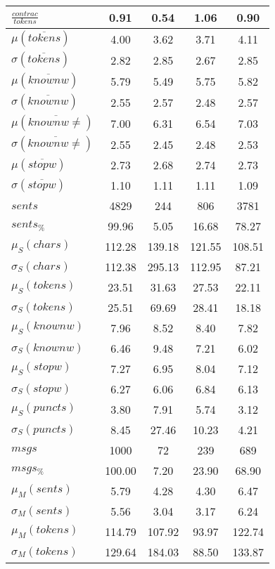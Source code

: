 \begin{table}[h!]
\begin{center}
\begin{tabular}{| l || c | c | c | c |}
$\frac{contrac}{tokens}$ & 0.91  & 0.54  & 1.06  & 0.90 \\\hline\hline
$\mu(\overline{tokens})$ & 4.00  & 3.62  & 3.71  & 4.11 \\
$\sigma(\overline{tokens})$ & 2.82  & 2.85  & 2.67  & 2.85 \\\hline
$\mu(\overline{knownw})$ & 5.79  & 5.49  & 5.75  & 5.82 \\
$\sigma(\overline{knownw})$ & 2.55  & 2.57  & 2.48  & 2.57 \\\hline
$\mu(\overline{knownw \neq})$ & 7.00  & 6.31  & 6.54  & 7.03 \\
$\sigma(\overline{knownw \neq})$ & 2.55  & 2.45  & 2.48  & 2.53 \\\hline
$\mu(\overline{stopw})$ & 2.73  & 2.68  & 2.74  & 2.73 \\
$\sigma(\overline{stopw})$ & 1.10  & 1.11  & 1.11  & 1.09 \\\hline\hline
$sents$ & 4829  & 244  & 806  & 3781 \\
$sents_{\%}$ & 99.96  & 5.05  & 16.68  & 78.27 \\\hline
$\mu_S(chars)$ & 112.28  & 139.18  & 121.55  & 108.51 \\
$\sigma_S(chars)$ & 112.38  & 295.13  & 112.95  & 87.21 \\\hline
$\mu_S(tokens)$ & 23.51  & 31.63  & 27.53  & 22.11 \\
$\sigma_S(tokens)$ & 25.51  & 69.69  & 28.41  & 18.18 \\\hline
$\mu_S(knownw)$ & 7.96  & 8.52  & 8.40  & 7.82 \\
$\sigma_S(knownw)$ & 6.46  & 9.48  & 7.21  & 6.02 \\\hline
$\mu_S(stopw)$ & 7.27  & 6.95  & 8.04  & 7.12 \\
$\sigma_S(stopw)$ & 6.27  & 6.06  & 6.84  & 6.13 \\\hline
$\mu_S(puncts)$ & 3.80  & 7.91  & 5.74  & 3.12 \\
$\sigma_S(puncts)$ & 8.45  & 27.46  & 10.23  & 4.21 \\\hline\hline
$msgs$ & 1000  & 72  & 239  & 689 \\
$msgs_{\%}$ & 100.00  & 7.20  & 23.90  & 68.90 \\\hline
$\mu_M(sents)$ & 5.79  & 4.28  & 4.30  & 6.47 \\
$\sigma_M(sents)$ & 5.56  & 3.04  & 3.17  & 6.24 \\\hline
$\mu_M(tokens)$ & 114.79  & 107.92  & 93.97  & 122.74 \\
$\sigma_M(tokens)$ & 129.64  & 184.03  & 88.50  & 133.87 \\\hline

\end{tabular}
\end{center}
\end{table}
